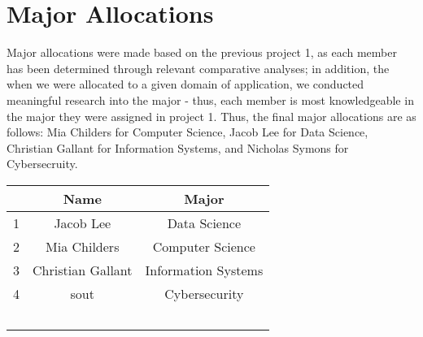 
\section{\textbf{Major Allocations}}

Major allocations were made based on the previous project 1, as each member has been determined through relevant comparative analyses; in addition, the when we were allocated to a given domain of application, we conducted meaningful research into the major - thus, each member is most knowledgeable in the major they were assigned in project 1. Thus, the final major allocations are as follows: Mia Childers for Computer Science, Jacob Lee for Data Science, Christian Gallant for Information Systems, and Nicholas Symons for Cybersecruity. 

\begin{center}
    \begin{tabular}{ |c|c|c| }
        \hline
        & Name & Major \\
      \hline
      1 & Jacob Lee & Data Science\\
      \hline
      2 & Mia Childers & Computer Science\\
      \hline
      3 & Christian Gallant & Information Systems\\
      \hline
      4 & sout{Nicholas Symons & Cybersecurity}\\\
      \hline
    \end{tabular}
    \end{center}
